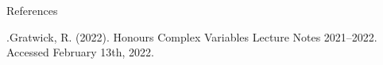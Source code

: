 \documentclass{beamer}
\begin{document}
\begin{frame}{References}
\begin{thebibliography}
	.Gratwick, R. (2022). Honours Complex Variables Lecture Notes 2021–2022. Accessed February 13th, 2022.
\end{thebibliography}
\end{frame}
\end{document}
